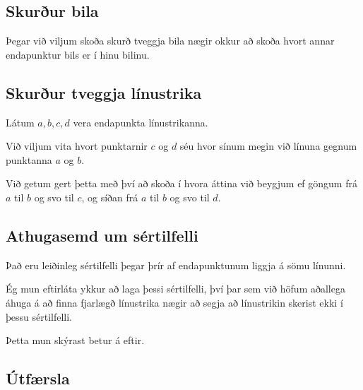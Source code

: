 \subsection{Skurður bila}
{
    {
        \item<1-> Þegar við viljum skoða skurð tveggja bila nægir okkur að skoða hvort annar endapunktur bils er í hinu bilinu.
        \item<2->[] 
    }
}

\subsection{Skurður tveggja línustrika}
{
    {
        \item<1-> Látum $a, b, c, d$ vera endapunkta línustrikanna.
        \item<2-> Við viljum vita hvort punktarnir $c$ og $d$ séu hvor sínum megin við línuna gegnum punktanna $a$ og $b$.
        \item<3-> Við getum gert þetta með því að skoða í hvora áttina við beygjum ef göngum frá $a$ til $b$ og svo til $c$,
                    og síðan frá $a$ til $b$ og svo til $d$.
    }
}

\subsection{Athugasemd um sértilfelli}
{
    {
        \item<1-> Það eru leiðinleg sértilfelli þegar þrír af endapunktunum liggja á sömu línunni.
        \item<2-> Ég mun eftirláta ykkur að laga þessi sértilfelli, því þar sem við höfum aðallega
                    áhuga á að finna fjarlægð línustrika nægir að segja að línustrikin skerist ekki í þessu sértilfelli.
        \item<3-> Þetta mun skýrast betur á eftir.
    }
}

\subsection{Útfærsla}
{
}

